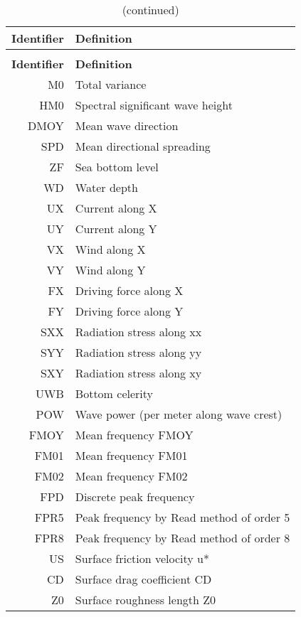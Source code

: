 \begin{longtable}{rl}
\caption{List of 2D results variables}
\label{tab:resultvar}
\\
%
\toprule
\toprule
\textbf{Identifier} & \textbf{Definition} \\
\midrule
%
\endfirsthead
\caption{(continued)}\\
%
\toprule
\toprule
\textbf{Identifier} & \textbf{Definition} \\
\midrule
%
\endhead
\bottomrule
\bottomrule
%
\endfoot
%
M0 &  Total variance \\
HM0  &  Spectral significant wave height  \\
DMOY  &  Mean wave direction  \\
SPD  &  Mean directional spreading  \\
ZF &  Sea bottom level  \\
WD &  Water depth  \\
UX &  Current along X  \\
UY &  Current along Y  \\
VX &  Wind along X  \\
VY &  Wind along Y  \\
FX &  Driving force along X  \\
FY &  Driving force along Y  \\
SXX  &  Radiation stress along xx  \\
SYY  &  Radiation stress along yy  \\
SXY  &  Radiation stress along xy  \\
UWB  &  Bottom celerity  \\
POW  &  Wave power (per meter along wave crest)  \\
FMOY  &  Mean frequency FMOY  \\
FM01  &  Mean frequency FM01  \\
FM02  &  Mean frequency FM02  \\
FPD  &  Discrete peak frequency  \\
FPR5  &  Peak frequency by Read method of order 5  \\
FPR8  &  Peak frequency by Read method of order 8  \\
US &  Surface friction velocity u*  \\
CD &  Surface drag coefficient CD  \\
Z0 &  Surface roughness length Z0  \\

\end{longtable}
